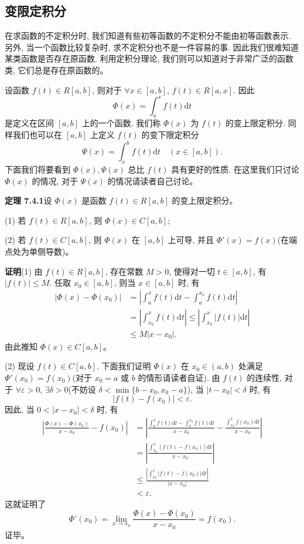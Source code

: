 \documentclass[UTF8, 12pt, fontset=fandol, oneside]{ctexart}
\begin{document}
\subsection{变限定积分}

在求函数的不定积分时, 我们知道有些初等函数的不定积分不能由初等函数表示. 另外, 当一个函数比较复杂时, 求不定积分也不是一件容易的事. 因此我们很难知道某类函数是否存在原函数. 利用定积分理论, 我们则可以知道对于非常广泛的函数类, 它们总是存在原函数的。

设函数 $f(t)\in R[a,b]$, 则对于 $\forall x\in[a,b]$, $f(t)\in R[a,x]$. 因此
\[
  \Phi(x)=\int_a^x f(t)\mathrm dt
\]
是定义在区间 $[a,b]$ 上的一个函数. 我们称 $\Phi(x)$ 为 $f(t)$ 的变上限定积分. 同样我们也可以在 $[a,b]$ 上定义 $f(t)$ 的变下限定积分
\[
  \Psi(x)=\int_x^b f(t)\mathrm dt\quad(x\in[a,b]).
\]
下面我们将要看到 $\Phi(x),\Psi(x)$ 总比 $f(t)$ 具有更好的性质. 在这里我们只讨论 $\Phi(x)$ 的情况, 对于 $\Psi(x)$ 的情况请读者自己讨论。

\noindent\textbf{定理 7.4.1}\quad 设 $\Phi(x)$ 是函数 $f(t)\in R[a,b]$ 的变上限定积分。

(1) 若 $f(t)\in R[a,b]$, 则 $\Phi(x)\in C[a,b]$;

(2) 若 $f(t)\in C[a,b]$, 则 $\Phi(x)$ 在 $[a,b]$ 上可导, 并且 $\Phi'(x)=f(x)$(在端点处为单侧导数)。

\noindent\textbf{证明}\quad (1) 由 $f(t)\in R[a,b]$, 存在常数 $M>0$, 使得对一切 $t\in[a,b]$, 有 $|f(t)|\leq M$. 任取 $x_0\in[a,b]$, 则当 $x\in[a,b]$ 时, 有
\[
\begin{aligned}
  |\Phi(x)-\Phi(x_0)|
  &=\left|\int_a^x f(t)\mathrm dt-\int_a^{x_0} f(t)\mathrm dt\right|\\
  &=\left|\int_{x_0}^x f(t)\mathrm dt\right|
  \leq \left|\int_{x_0}^x |f(t)|\mathrm dt\right|\\
  &\leq M|x-x_0|.
\end{aligned}
\]
由此推知 $\Phi(x)\in C[a,b]$。

(2) 现设 $f(t)\in C[a,b]$. 下面我们证明 $\Phi(x)$ 在 $x_0\in(a,b)$ 处满足 $\Phi'(x_0)=f(x_0)$(对于 $x_0=a$ 或 $b$ 的情形请读者自证). 由 $f(t)$ 的连续性, 对于 $\forall\varepsilon>0$, $\exists\delta>0$(不妨设 $\delta<\min\{b-x_0,x_0-a\}$), 当 $|t-x_0|<\delta$ 时, 有
\[
  |f(t)-f(x_0)|<\varepsilon.
\]
因此, 当 $0<|x-x_0|<\delta$ 时, 有
\[
\begin{aligned}
  \left|\frac{\Phi(x)-\Phi(x_0)}{x-x_0}-f(x_0)\right|
  &=\left|\frac{\int_a^x f(t)\mathrm dt-\int_a^{x_0} f(t)\mathrm dt}{x-x_0}
  -\frac{\int_{x_0}^x f(x_0)\mathrm dt}{x-x_0}\right|\\
  &=\left|\frac{\int_{x_0}^x [f(t)-f(x_0)]\mathrm dt}{x-x_0}\right|\\
  &\leq \frac{\left|\int_{x_0}^x |f(t)-f(x_0)|\mathrm dt\right|}{|x-x_0|}\\
  &<\varepsilon.
\end{aligned}
\]
这就证明了
\[
  \Phi'(x_0)=\lim_{x\to x_0}\frac{\Phi(x)-\Phi(x_0)}{x-x_0}=f(x_0).
\]
证毕。
\end{document}
